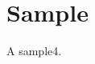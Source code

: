 \documentclass{report}
\begin{document}
\chapter{Sample}

A \gls{sample4}.

\printunsrtglossaries
\end{document}
